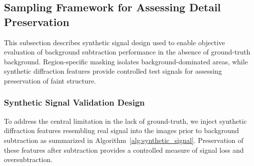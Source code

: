 \documentclass[iucr]{iucrjournals}
\begin{document}
\subsection{Sampling Framework for Assessing Detail Preservation}

This subsection describes synthetic signal design used to enable objective evaluation of background subtraction performance in the absence of ground-truth background. Region-specific masking isolates background-dominated areas, while synthetic diffraction features provide controlled test signals for assessing preservation of faint structure.

\subsubsection{Synthetic Signal Validation Design}

To address the central limitation in the lack of ground-truth, we inject synthetic diffraction features resembling real signal into the images prior to background subtraction as summarized in Algorithm~\ref{alg:synthetic_signal}. Preservation of these features after subtraction provides a controlled measure of signal loss and oversubtraction.
\end{document}
